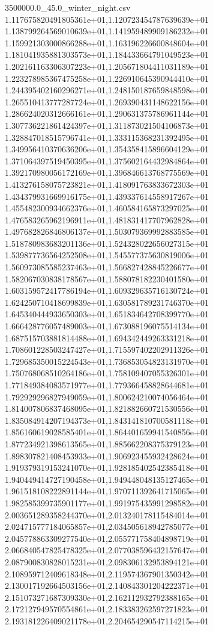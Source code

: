 \begin{filecontents*}{3500000.0_45.0_winter_night.csv}
1.117675820491805361e+01,1.120723454787639639e+01
1.138799264569010639e+01,1.141959489909186232e+01
1.159921303000866288e+01,1.163196226600848604e+01
1.181041935881303573e+01,1.184433664791049523e+01
1.202161163306307223e+01,1.205671804411031189e+01
1.223278985367475258e+01,1.226910645390944410e+01
1.244395402160296271e+01,1.248150187659848598e+01
1.265510413777287724e+01,1.269390431148622156e+01
1.286624020312666161e+01,1.290631375786961144e+01
1.307736221861424397e+01,1.311873021504106873e+01
1.328847018515796741e+01,1.333115368231392495e+01
1.349956410370636206e+01,1.354358415896604129e+01
1.371064397519450395e+01,1.375602164432984864e+01
1.392170980056172169e+01,1.396846613768775569e+01
1.413276158075723821e+01,1.418091763833672303e+01
1.434379931669916175e+01,1.439337614558917267e+01
1.455482300934662376e+01,1.460584165873297025e+01
1.476583265962196911e+01,1.481831417707962828e+01
1.497682826846806137e+01,1.503079369992883585e+01
1.518780983683201136e+01,1.524328022656027315e+01
1.539877736564252508e+01,1.545577375630819006e+01
1.560973085585237463e+01,1.566827428845226677e+01
1.582067030838178567e+01,1.588078182230401580e+01
1.603159572417786194e+01,1.609329635716130724e+01
1.624250710418699839e+01,1.630581789231746370e+01
1.645340444933650303e+01,1.651834642708399770e+01
1.666428776057489003e+01,1.673088196075514134e+01
1.687515703881814488e+01,1.694342449263331218e+01
1.708601228503247427e+01,1.715597402202911326e+01
1.729685350015224543e+01,1.736853054823131970e+01
1.750768068510264186e+01,1.758109407055326301e+01
1.771849384083571977e+01,1.779366458828644681e+01
1.792929296827949059e+01,1.800624210074056464e+01
1.814007806837468095e+01,1.821882660721530556e+01
1.835084914207194373e+01,1.843141810700581118e+01
1.856160619028585401e+01,1.864401659941540856e+01
1.877234921398613565e+01,1.885662208375379123e+01
1.898307821408453933e+01,1.906923455932428624e+01
1.919379319153241070e+01,1.928185402542385418e+01
1.940449414727190458e+01,1.949448048135127465e+01
1.961518108222891144e+01,1.970711392641715065e+01
1.982585399735901177e+01,1.991975435991298582e+01
2.003651289358244370e+01,2.013240178115484014e+01
2.024715777184065857e+01,2.034505618942785077e+01
2.045778863309277540e+01,2.055771758404898719e+01
2.066840547825478325e+01,2.077038596432157647e+01
2.087900830828015231e+01,2.098306132953894121e+01
2.108959712409618348e+01,2.119574367901350342e+01
2.130017192664503156e+01,2.140843301204222371e+01
2.151073271687309330e+01,2.162112932792388165e+01
2.172127949570554861e+01,2.183383262597271823e+01
2.193181226409021178e+01,2.204654290547114215e+01

\end{filecontents*}
